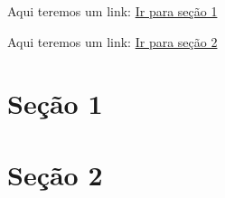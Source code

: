 \documentclass[a4paper, 12pt]{article}
\begin{document}
Aqui teremos um link: \hyperlink{secao1}{Ir para seção 1}

Aqui teremos um link: \hyperlink{secao2}{Ir para seção 2}

\newpage

\hypertarget{secao1}{ }
\section{Seção 1} 

\lipsum

\hypertarget{secao2}{ }
\section{Seção 2} 

\lipsum
\end{document}
